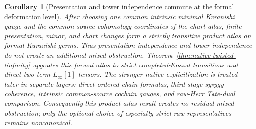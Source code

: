 \documentclass[11pt]{article}
\newtheorem{corollary}[theorem]{Corollary}
\theoremstyle{definition}
\begin{document}
\begin{corollary}[Presentation and tower independence commute at the formal deformation level]\label{cor:kuranishi-presentation-tower-product}
After choosing one common intrinsic minimal Kuranishi gauge and the
common-source cohomology coordinates of the chart atlas, finite presentation,
minor, and chart changes form a strictly transitive product atlas on formal
Kuranishi germs.  Thus presentation independence and tower independence do
not create an additional mixed obstruction.  Theorem~\ref{thm:native-twisted-linfinity}
upgrades this formal atlas to strict completed-Koszul transitions and direct
two-term $L_\infty[1]$ tensors.  The stronger native explicitization is treated later in separate layers:
direct ordered chain formulas, third-stage syzygy coherence, intrinsic
common-source cochain gauges, and raw-Herr Tate-dual comparison.  Consequently
this product-atlas result creates no residual mixed obstruction; only the
optional choice of especially strict raw representatives remains
noncanonical.
\end{corollary}
\end{document}
